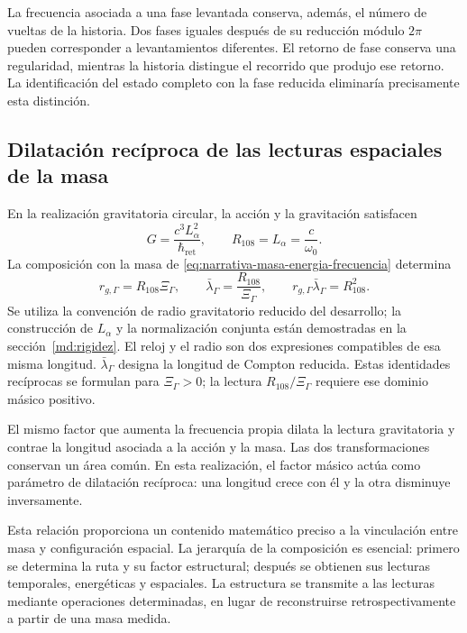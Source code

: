 La frecuencia asociada a una fase levantada conserva, además, el número de
vueltas de la historia. Dos fases iguales después de su reducción módulo
$2\pi$ pueden corresponder a levantamientos diferentes. El retorno de fase
conserva una regularidad, mientras la historia distingue el recorrido que
produjo ese retorno. La identificación del estado completo con la fase
reducida eliminaría precisamente esta distinción.

\subsection{Dilatación recíproca de las lecturas espaciales de la masa}
\label{subsec:narrativa-reciprocidad-espacial}

En la realización gravitatoria circular, la acción y la gravitación
satisfacen
\begin{equation}
 G=\frac{c^3L_\alpha^2}{\hbar_{\mathrm{ret}}},
 \qquad R_{108}=L_\alpha=\frac{c}{\omega_0}.
 \label{eq:narrativa-gravedad-accion}
\end{equation}
La composición con la masa de
\eqref{eq:narrativa-masa-energia-frecuencia} determina
\begin{equation}
 \boxed{
 r_{g,\Gamma}=R_{108}\Xi_\Gamma,
 \qquad
 \bar\lambda_\Gamma=\frac{R_{108}}{\Xi_\Gamma},
 \qquad
 r_{g,\Gamma}\bar\lambda_\Gamma=R_{108}^{2}.}
 \label{eq:narrativa-longitudes-reciprocas}
\end{equation}
Se utiliza la convención de radio gravitatorio reducido del desarrollo;
la construcción de $L_\alpha$ y la normalización conjunta están
demostradas en la sección~\ref{md:rigidez}. El reloj y el radio son
dos expresiones compatibles de esa misma longitud.
$\bar\lambda_\Gamma$ designa la longitud de Compton reducida. Estas
identidades recíprocas se formulan para $\Xi_\Gamma>0$; la lectura
$R_{108}/\Xi_\Gamma$ requiere ese dominio másico positivo.

El mismo factor que aumenta la frecuencia propia dilata la lectura
gravitatoria y contrae la longitud asociada a la acción y la masa. Las dos
transformaciones conservan un área común. En esta realización, el factor
másico actúa como parámetro de dilatación recíproca: una longitud crece con
él y la otra disminuye inversamente.

Esta relación proporciona un contenido matemático preciso a la vinculación
entre masa y configuración espacial. La jerarquía de la composición es
esencial: primero se determina la ruta y su factor estructural; después se
obtienen sus lecturas temporales, energéticas y espaciales. La estructura
se transmite a las lecturas mediante operaciones determinadas, en lugar de
reconstruirse retrospectivamente a partir de una masa medida.

